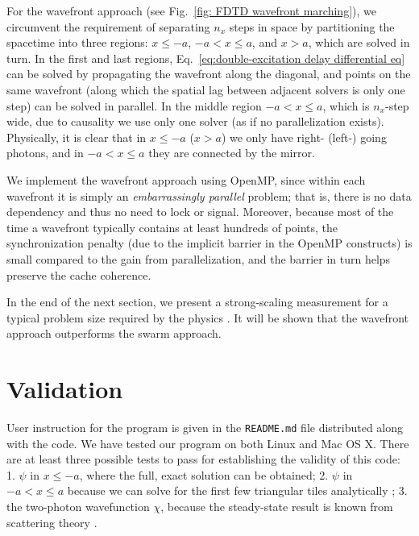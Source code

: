 \documentclass[final,1p,times]{elsarticle}
\begin{document}
For the wavefront approach (see Fig.~\ref{fig: FDTD wavefront marching}), we circumvent the requirement of separating $n_x$ steps in space by partitioning the spacetime into three regions: $x\leq-a$, $-a<x\leq a$, and $x>a$, which are solved in turn. In the first and last regions, Eq.~\eqref{eq:double-excitation delay differential eq} can be solved by propagating the wavefront along the diagonal, and points on the same wavefront (along which the spatial lag between adjacent solvers is only one step) can be solved in parallel. In the middle region $-a<x\leq a$, which is $n_x$-step wide, due to causality  
we use only one solver (as if no parallelization exists). Physically, it is clear \cite{FangNJP18} that in $x\leq-a$ ($x>a$) we only have right- (left-) going photons, and in $-a<x\leq a$ they are connected by the mirror.

We implement the wavefront approach using OpenMP, since within each wavefront it is simply an \emph{embarrassingly parallel} problem; that is, there is no data dependency and thus no need to lock or signal. Moreover, because most of the time a wavefront typically contains at least hundreds of points, the synchronization penalty (due to the implicit barrier in the OpenMP constructs) is small compared to the gain from parallelization, and the barrier in turn helps preserve the cache coherence.


In the end of the next section, we present a strong-scaling measurement for a typical problem size required by the physics \cite{FangNJP18,FangPRA15err,FrancescoBIC}. It will be shown that the wavefront approach outperforms the swarm approach. 


\section{Validation}
User instruction for the program is given in the \texttt{README.md} file distributed along with the code.
We have tested our program on both Linux and Mac OS X.
There are at least three possible tests to pass for establishing the validity of this code: 1. $\psi$ in $x\leq-a$, where the full, exact solution can be obtained; 2. $\psi$ in $-a<x\leq a$ because we can solve for the first few triangular tiles analytically \cite{FangNJP18}; 3. the two-photon wavefunction $\chi$, because the steady-state result is known from scattering theory \cite{FangPRA15}.
\end{document}
